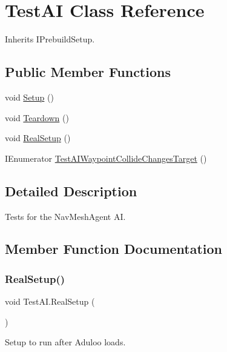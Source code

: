 \hypertarget{class_test_a_i}{}\section{Test\+AI Class Reference}
\label{class_test_a_i}


Inherits I\+Prebuild\+Setup.

\subsection*{Public Member Functions}
\begin{DoxyCompactItemize}
\item 
void \hyperlink{class_test_a_i_a75293e26155661268ce3760bc9d391e1}{Setup} ()
\item 
void \hyperlink{class_test_a_i_a8aaa5d3fb6588e052776e3f47dfb0e9a}{Teardown} ()
\item 
void \hyperlink{class_test_a_i_ae82b5aeaa28f4930c2167a3523294f58}{Real\+Setup} ()
\item 
I\+Enumerator \hyperlink{class_test_a_i_a758bb47638d55186c1fba8128c5ef8c2}{Test\+A\+I\+Waypoint\+Collide\+Changes\+Target} ()
\end{DoxyCompactItemize}


\subsection{Detailed Description}
Tests for the Nav\+Mesh\+Agent AI. 



\subsection{Member Function Documentation}
\mbox{\label{class_test_a_i_ae82b5aeaa28f4930c2167a3523294f58}} 
\subsubsection{\texorpdfstring{Real\+Setup()}{RealSetup()}}
{\footnotesize\ttfamily void Test\+A\+I.\+Real\+Setup (\begin{DoxyParamCaption}{ }\end{DoxyParamCaption})}



Setup to run after Aduloo loads. 

